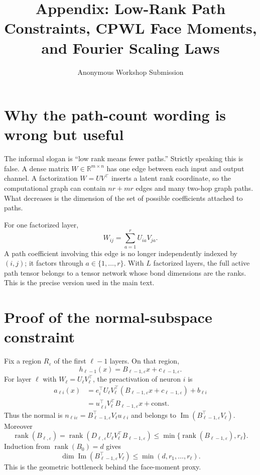 \documentclass[10pt]{article}
\title{Appendix: Low-Rank Path Constraints, CPWL Face Moments, and Fourier Scaling Laws}
\author{Anonymous Workshop Submission}
\date{}
\newcommand{\R}{\mathbb{R}}
\newcommand{\rank}{\operatorname{rank}}
\newcommand{\im}{\operatorname{Im}}
\begin{document}
\maketitle

\section{Why the path-count wording is wrong but useful}
The informal slogan is ``low rank means fewer paths.''  Strictly speaking this is false.  A dense matrix $W\in\R^{m\times n}$ has one edge between each input and output channel.  A factorization $W=UV^\top$ inserts a latent rank coordinate, so the computational graph can contain $n r + m r$ edges and many two-hop graph paths.  What decreases is the dimension of the set of possible coefficients attached to paths.

For one factorized layer,
\begin{equation}
W_{ij}=\sum_{a=1}^{r}U_{ia}V_{ja}.
\end{equation}
A path coefficient involving this edge is no longer independently indexed by $(i,j)$; it factors through $a\in\{1,\ldots,r\}$.  With $L$ factorized layers, the full active path tensor belongs to a tensor network whose bond dimensions are the ranks.  This is the precise version used in the main text.

\section{Proof of the normal-subspace constraint}
Fix a region $R_\varepsilon$ of the first $\ell-1$ layers.  On that region,
\begin{equation}
h_{\ell-1}(x)=B_{\ell-1,\varepsilon}x+c_{\ell-1,\varepsilon}.
\end{equation}
For layer $\ell$ with $W_\ell=U_\ell V_\ell^\top$, the preactivation of neuron $i$ is
\begin{align}
a_{\ell i}(x)
&=e_i^\top U_\ell V_\ell^\top(B_{\ell-1,\varepsilon}x+c_{\ell-1,\varepsilon})+b_{\ell i}\\
&=u_{\ell i}^\top V_\ell^\top B_{\ell-1,\varepsilon}x+\mathrm{const.}
\end{align}
Thus the normal is $n_{\ell i\varepsilon}=B_{\ell-1,\varepsilon}^\top V_\ell u_{\ell i}$ and belongs to $\im(B_{\ell-1,\varepsilon}^\top V_\ell)$.  Moreover
\begin{equation}
\rank(B_{\ell,\varepsilon})=\rank(D_{\ell,\varepsilon}U_\ell V_\ell^\top B_{\ell-1,\varepsilon})
\le \min\{\rank(B_{\ell-1,\varepsilon}),r_\ell\}.
\end{equation}
Induction from $\rank(B_0)=d$ gives
\begin{equation}
\dim \im(B_{\ell-1,\varepsilon}^\top V_\ell)\le \min(d,r_1,\ldots,r_\ell).
\end{equation}
This is the geometric bottleneck behind the face-moment proxy.
\end{document}
